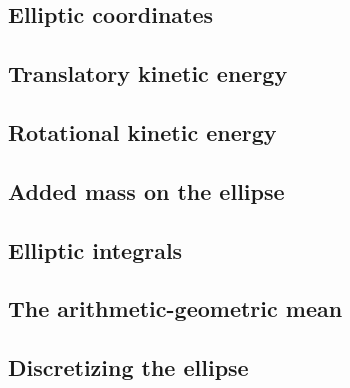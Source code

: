 \subsection{Elliptic coordinates}


\subsection{Translatory kinetic energy}


\subsection{Rotational kinetic energy}


\subsection{Added mass on the ellipse}


\subsection{Elliptic integrals}


\subsection{The arithmetic-geometric mean}


\subsection{Discretizing the ellipse}

